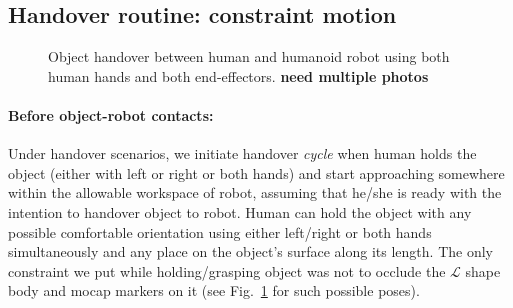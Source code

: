 \documentclass[a4paper, 12pt, oneside]{Thesis}  %
\begin{document}
\subsection{Handover routine: constraint motion}

\begin{figure}[hptb]
	\caption{Object handover between human and humanoid robot using both human hands and both end-effectors. \textbf{need multiple photos}}
	\label{fig:h-r-pipe-handover}
\end{figure}


\paragraph*{Before object-robot contacts:} Under handover scenarios, we initiate handover \textit{cycle} when human holds the object (either with left or right or both hands) and start approaching somewhere within the allowable workspace of robot, assuming that he/she is ready with the intention to handover object to robot. Human can hold the object with any possible comfortable orientation using either left/right or both hands simultaneously and any place on the object's surface along its length. The only constraint we put while holding/grasping object was not to occlude the $\mathcal{L}$ shape body and mocap markers on it (see Fig.~\ref{fig:h-r-pipe-handover} for such possible poses).
\end{document}
